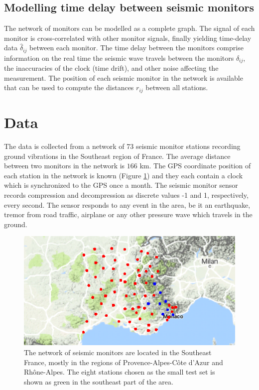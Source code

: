 \documentclass[12pt, sumlimits, intlimits]{article}
\begin{document}
\subsection{Modelling time delay between seismic monitors}
The network of monitors can be modelled as a complete graph. The signal of each monitor is cross-correlated with other monitor signals, finally yielding time-delay data $\hat{\delta}_{ij}$ between each monitor. The time delay between the monitors comprise information on the real time the seismic wave travels between the monitors $\delta_{ij}$, the inaccuracies of the clock (time drift), and other noise affecting the measurement. The position of each seismic monitor in the network is available that can be used to compute the distances $r_{ij}$ between all stations.

\section{Data}

The data is collected from a network of 73 seismic monitor stations recording ground vibrations in the Southeast region of France. The average distance between two monitors in the network is $166$ km. The GPS coordinate position of each station in the network is known (Figure \ref{fig:monitornetwork}) and they each contain a clock which is synchronized to the GPS once a month. The seismic monitor sensor records compression and decompression as discrete values -1 and 1, respectively, every second. The sensor responds to any event in the area, be it an earthquake, tremor from road traffic, airplane or any other pressure wave which travels in the ground.

\begin{figure}[ht]
	\begin{center}   
		\includegraphics[width=\textwidth]{../figures/TestStations_zoom.png}
	\end{center}
	\caption{The network of seismic monitors are located in the Southeast France, mostly in the regions of Provence-Alpes-C\^{o}te d'Azur and Rh\^{o}ne-Alpes. The eight stations chosen as the small test set is shown as green in the southeast part of the area.}\label{fig:monitornetwork}
\end{figure}
\end{document}

